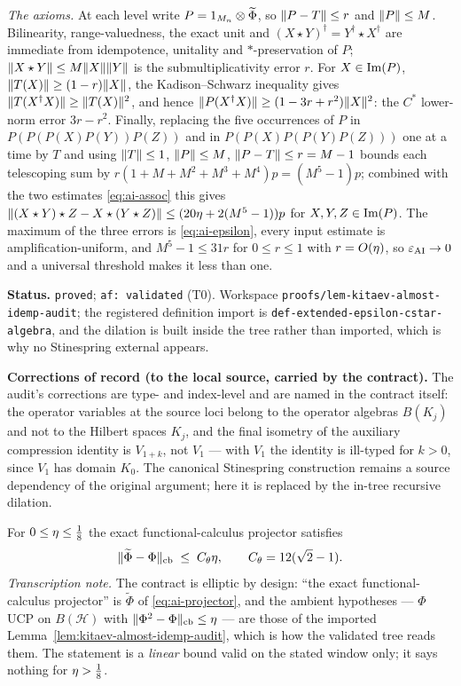 \emph{The axioms.} At each level write $P=1_{M_{n}}\otimes\widetilde\Phi$, so $\lVert P-T\rVert\le r$ and
$\lVert P\rVert\le M$. Bilinearity, range-valuedness, the exact unit and
$(X\star Y)^{\dagger}=Y^{\dagger}\star X^{\dagger}$ are immediate from idempotence,
unitality and $*$-preservation of $P$; $\lVert X\star Y\rVert\le M\lVert X\rVert\lVert Y\rVert$ is the
submultiplicativity error $r$. For $X\in\operatorname{Im}(P)$, $\lVert T(X)\rVert\ge(1-r)\lVert X\rVert$, the
Kadison--Schwarz inequality gives $\lVert T(X^{\dagger}X)\rVert\ge\lVert T(X)\rVert^{2}$, and hence
$\lVert P(X^{\dagger}X)\rVert\ge(1-3r+r^{2})\lVert X\rVert^{2}$: the $C^{*}$ lower-norm error
$3r-r^{2}$. Finally, replacing the five occurrences of $P$ in
$P(P(P(X)P(Y))P(Z))$ and in $P(P(X)P(P(Y)P(Z)))$ one at a time by $T$ and using
$\lVert T\rVert\le1$, $\lVert P\rVert\le M$, $\lVert P-T\rVert\le r=M-1$ bounds each telescoping sum by
$r(1+M+M^{2}+M^{3}+M^{4})p=(M^{5}-1)p$; combined with the two estimates
\eqref{eq:ai-assoc} this gives $\lVert (X\star Y)\star Z-X\star(Y\star Z)\rVert\le(20\eta+2(M^{5}-1))p$
for $X,Y,Z\in\operatorname{Im}(P)$. The maximum of the three errors is \eqref{eq:ai-epsilon}, every
input estimate is amplification-uniform, and $M^{5}-1\le31r$ for $0\le r\le1$ with
$r=O(\eta)$, so $\varepsilon_{\mathrm{AI}}\to0$ and a universal threshold makes it less than
one.

\medskip
\noindent\textbf{Status.} \texttt{proved}; \texttt{af: validated} (T0). Workspace
\texttt{proofs/lem-kitaev-almost-idemp-audit}; the registered definition import is
\texttt{def-extended-epsilon-cstar-algebra}, and the dilation is built inside the tree
rather than imported, which is why no Stinespring external appears.

\noindent\textbf{Corrections of record (to the local source, carried by the contract).}
The audit's corrections are type- and index-level and are named in the contract itself: the
operator variables at the source loci belong to the operator algebras $B(K_{j})$ and not to
the Hilbert spaces $K_{j}$, and the final isometry of the auxiliary compression identity is
$V_{1+k}$, not $V_{1}$ --- with $V_{1}$ the identity is ill-typed for $k>0$, since $V_{1}$
has domain $K_{0}$. The canonical Stinespring construction remains a source dependency of
the original argument; here it is replaced by the in-tree recursive dilation.

\begin{lemma}\label{lem:routef-functional-calculus-closeness}
For $0\le\eta\le\tfrac18$ the exact functional-calculus projector satisfies
\begin{equation}\label{eq:ai-closeness}
  \lVert \widetilde\Phi-\Phi\rVert_{\mathrm{cb}}\;\le\;C_{\theta}\eta,
  \qquad C_{\theta}=12(\sqrt2-1).
\end{equation}
\emph{Transcription note.} The contract is elliptic by design: ``the exact
functional-calculus projector'' is $\widetilde\Phi$ of \eqref{eq:ai-projector}, and the
ambient hypotheses --- $\Phi$ UCP on $B(\mathcal H)$ with
$\lVert \Phi^{2}-\Phi\rVert_{\mathrm{cb}}\le\eta$ --- are those of the imported
Lemma~\ref{lem:kitaev-almost-idemp-audit}, which is how the validated tree reads them. The
statement is a \emph{linear} bound valid on the stated window only; it says nothing for
$\eta>\tfrac18$.
\end{lemma}

